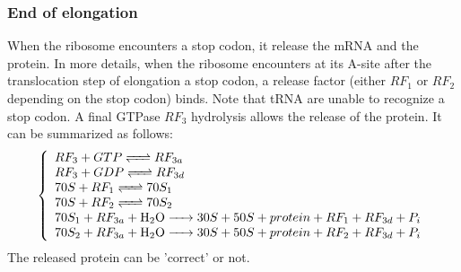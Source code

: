 \subsubsection{End of elongation}
When the ribosome encounters a stop codon, it release the mRNA and the protein. In more details, when the ribosome encounters at its A-site after the translocation step of elongation a stop codon, a release factor (either $RF_1$ or $RF_2$ depending on the stop codon) binds. Note that tRNA are unable to recognize a stop codon. A final GTPase $RF_3$ hydrolysis allows the release of the protein. It can be summarized as follows:
$$
  \left\{
    \begin{array}{l}
      \reactionRev{RF_3 + GTP}{RF_{3a}}{}{} \\
      \reactionRev{RF_3 + GDP}{RF_{3d}}{}{} \\
      \reactionRev{70S + RF_1}{70S_1}{}{} \\
      \reactionRev{70S + RF_2}{70S_2}{}{} \\
      \reactionIrr{70S_1 + RF_{3a} + \ce{H2O}}{30S + 50S + protein + RF_1 + RF_{3d} + P_i}{}{} \\
      \reactionIrr{70S_2 + RF_{3a} + \ce{H2O}}{30S + 50S + protein + RF_2 + RF_{3d} + P_i}{}{} \\
    \end{array}
  \right.
$$
The released protein can be 'correct' or not.


